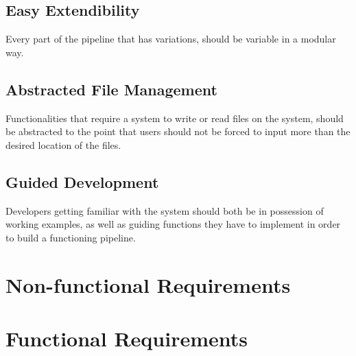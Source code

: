 \subsection{Easy Extendibility}

Every part of the pipeline that has variations, should be variable in a modular way.

\subsection{Abstracted File Management}

Functionalities that require a system to write or read files on the system, should be abstracted to the point that users should not be forced to input more than the desired location of the files.

\subsection{Guided Development}

Developers getting familiar with the system should both be in possession of working examples, as well as guiding functions they have to implement in order to build a functioning pipeline.

\section{Non-functional Requirements}

\section{Functional Requirements}